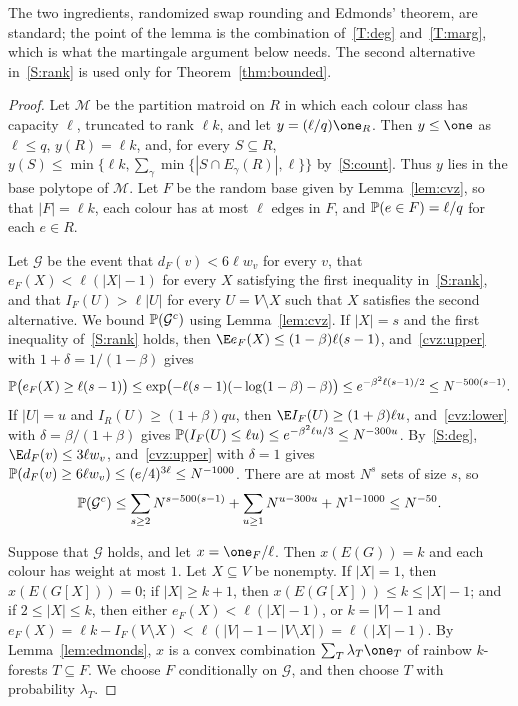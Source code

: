 The two ingredients, randomized swap rounding and Edmonds' theorem, are standard; the point of the lemma is the combination of~\ref{T:deg} and~\ref{T:marg}, which is what the martingale argument below needs.
The second alternative in~\ref{S:rank} is used only for Theorem~\ref{thm:bounded}.
\begin{proof}
Let $\mathcal M$ be the partition matroid on $R$ in which each colour class has capacity $\ell$, truncated to rank $\ell k$, and let $y=(\ell/q)\one_R$.
Then $y\le\one$ as $\ell\le q$, $y(R)=\ell k$, and, for every $S\subseteq R$, $y(S)\le\min\{\ell k,\sum_\gamma\min\{|S\cap E_\gamma(R)|,\ell\}\}$ by~\ref{S:count}.
Thus $y$ lies in the base polytope of $\mathcal M$.
Let $F$ be the random base given by Lemma~\ref{lem:cvz}, so that $|F|=\ell k$, each colour has at most $\ell$ edges in $F$, and $\mathbb{P}(e\in F)=\ell/q$ for each $e\in R$.

Let $\mathcal G$ be the event that $d_F(v)<6\ell w_v$ for every $v$, that $e_F(X)<\ell(|X|-1)$ for every $X$ satisfying the first inequality in~\ref{S:rank}, and that $I_F(U)>\ell|U|$ for every $U=V\setminus X$ such that $X$ satisfies the second alternative.
We bound $\mathbb{P}(\mathcal G^c)$ using Lemma~\ref{lem:cvz}.
If $|X|=s$ and the first inequality of~\ref{S:rank} holds, then $\E e_F(X)\le(1-\beta)\ell(s-1)$, and~\ref{cvz:upper} with $1+\delta=1/(1-\beta)$ gives
\[
\mathbb{P}\bigl(e_F(X)\ge\ell(s-1)\bigr)\le\exp\bigl(-\ell(s-1)(-\log(1-\beta)-\beta)\bigr)\le e^{-\beta^2\ell(s-1)/2}\le N^{-500(s-1)}.
\]
If $|U|=u$ and $I_R(U)\ge(1+\beta)q u$, then $\E I_F(U)\ge(1+\beta)\ell u$, and~\ref{cvz:lower} with $\delta=\beta/(1+\beta)$ gives $\mathbb{P}(I_F(U)\le\ell u)\le e^{-\beta^2\ell u/3}\le N^{-300u}$.
By~\ref{S:deg}, $\E d_F(v)\le3\ell w_v$, and~\ref{cvz:upper} with $\delta=1$ gives $\mathbb{P}(d_F(v)\ge6\ell w_v)\le(e/4)^{3\ell}\le N^{-1000}$.
There are at most $N^s$ sets of size $s$, so
\[
\mathbb{P}(\mathcal G^c)\le\sum_{s\ge2}N^{s-500(s-1)}+\sum_{u\ge1}N^{u-300u}+N^{1-1000}\le N^{-50}.
\]

Suppose that $\mathcal G$ holds, and let $x=\one_F/\ell$.
Then $x(E(G))=k$ and each colour has weight at most $1$.
Let $X\subseteq V$ be nonempty.
If $|X|=1$, then $x(E(G[X]))=0$; if $|X|\ge k+1$, then $x(E(G[X]))\le k\le|X|-1$; and if $2\le|X|\le k$, then either $e_F(X)<\ell(|X|-1)$, or $k=|V|-1$ and $e_F(X)=\ell k-I_F(V\setminus X)<\ell(|V|-1-|V\setminus X|)=\ell(|X|-1)$.
By Lemma~\ref{lem:edmonds}, $x$ is a convex combination $\sum_T\lambda_T\one_T$ of rainbow $k$-forests $T\subseteq F$.
We choose $F$ conditionally on $\mathcal G$, and then choose $T$ with probability $\lambda_T$.


\end{proof}
